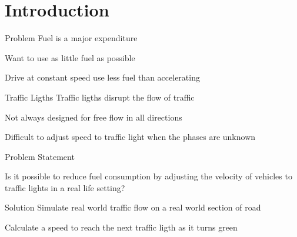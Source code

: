 

\section{Introduction}
\begin{frame}{Problem}
Fuel is a major expenditure

Want to use as little fuel as possible

Drive at constant speed use less fuel than accelerating
\end{frame}

\begin{frame}{Traffic Ligths}
Traffic ligths disrupt the flow of traffic

Not always designed for free flow in all directions

Difficult to adjust speed to traffic light when the phases are unknown
\end{frame}

\begin{frame}{Problem Statement}
\begin{center}
Is it possible to reduce fuel consumption by adjusting the velocity of vehicles to traffic lights in a real life setting?
\end{center}
\end{frame}

\begin{frame}{Solution}
Simulate real world traffic flow on a real world section of road

Calculate a speed to reach the next traffic ligth as it turns green
\end{frame}

